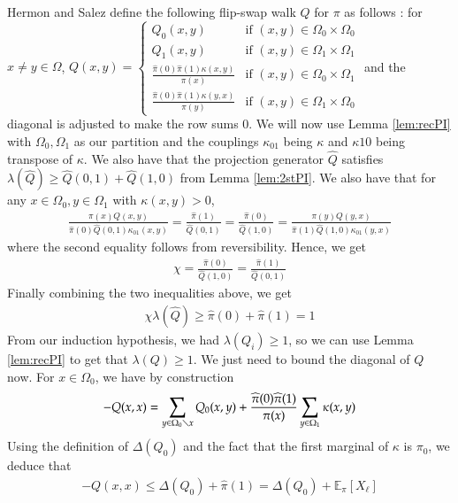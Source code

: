 Hermon and Salez \cite{HS19} define the following flip-swap walk $Q$ for $\pi$ as follows : for $x\neq y \in\Omega$,
$Q(x,y)=\begin{cases}
Q_0(x,y) & \text{if } (x,y) \in \Omega_0\times\Omega_0\\
Q_1(x,y) & \text{if } (x,y) \in \Omega_1\times\Omega_1\\
\frac{\hat{\pi}(0)\hat{\pi}(1)\kappa(x,y)}{\pi(x)} & \text{if } (x,y) \in \Omega_0\times\Omega_1\\
\frac{\hat{\pi}(0)\hat{\pi}(1)\kappa(y,x)}{\pi(y)} & \text{if } (x,y) \in \Omega_1\times\Omega_0
\end{cases}$
and the diagonal is adjusted to make the row sums 0.
We will now use Lemma \ref{lem:recPI} with $\Omega_0,\Omega_1$ as our partition and the couplings $\kappa_{01}$ being $\kappa$ and $\kappa{10}$ being transpose of $\kappa$. We also have that the projection generator $\hat{Q}$ satisfies $\lambda(\hat{Q})\geq \hat{Q}(0,1)+\hat{Q}(1,0)$ from Lemma \ref{lem:2stPI}. We also have that for any $x\in\Omega_0, y\in\Omega_1$ with $\kappa(x,y)>0$,
\begin{align*}
  \frac{\pi(x)Q(x,y)}{\hat{\pi}(0)\hat{Q}(0,1)\kappa_{01}(x,y)} = \frac{\hat{\pi}(1)}{\hat{Q}(0,1)} =\frac{\hat{\pi}(0)}{\hat{Q}(1,0)} = \frac{\pi(y)Q(y,x)}{\hat{\pi}(1)\hat{Q}(1,0)\kappa_{01}(y,x)}
  \end{align*}
  where the second equality follows from reversibility. Hence, we get
  \begin{align*}
    \chi = \frac{\hat{\pi}(0)}{\hat{Q}(1,0)}=\frac{\hat{\pi}(1)}{\hat{Q}(0,1)}
  \end{align*}
  Finally combining the two inequalities above, we get
  \begin{align*}
    \chi\lambda(\hat{Q})\geq \hat{\pi}(0)+\hat{\pi}(1) = 1
  \end{align*}
  From our induction hypothesis, we had $\lambda(Q_i)\geq 1$, so we can use Lemma \ref{lem:recPI} to get that $\lambda(Q)\geq 1$. We just need to bound the diagonal of $Q$ now. For $x \in \Omega_0$, we have by construction
  \begin{align*}
    -Q(x,x)=\sum\limits_{y \in \Omega_0 \diagdown x}Q_0(x,y) + \frac{\hat{\pi}(0)\hat{\pi}(1)}{\pi(x)}\sum\limits_{y\in\Omega_1}\kappa(x,y)
  \end{align*}
Using the definition of $\Delta(Q_0)$ and the fact that the first marginal of $\kappa$ is $\pi_0$, we deduce that
\begin{align*}
  -Q(x,x) \leq \Delta(Q_0) + \hat{\pi}(1) = \Delta(Q_0)+\mathbb{E}_{\pi}[X_\ell]
\end{align*}
